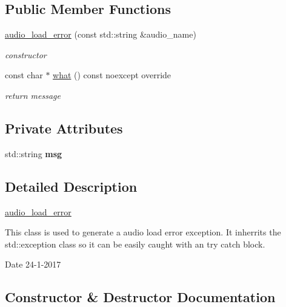 \subsection*{Public Member Functions}
\begin{DoxyCompactItemize}
\item 
\hyperlink{classaudio__load__error_a6eea512cfea7b3d438afc5c1af8c63aa}{audio\+\_\+load\+\_\+error} (const std\+::string \&audio\+\_\+name)
\begin{DoxyCompactList}\small\item\em constructor \end{DoxyCompactList}\item 
const char $\ast$ \hyperlink{classaudio__load__error_a364ad9c1cb7de37f0cb3e33dbebbaa47}{what} () const noexcept override
\begin{DoxyCompactList}\small\item\em return message \end{DoxyCompactList}\end{DoxyCompactItemize}
\subsection*{Private Attributes}
\begin{DoxyCompactItemize}
\item 
\mbox{\label{classaudio__load__error_a95628dfb2fb03d93f2864a7e87cf7e79}} 
std\+::string {\bfseries msg}
\end{DoxyCompactItemize}


\subsection{Detailed Description}
\hyperlink{classaudio__load__error}{audio\+\_\+load\+\_\+error} 

This class is used to generate a audio load error exception. It inherrits the std\+::exception class so it can be easily caught with an try catch block.

\begin{DoxyDate}{Date}
24-\/1-\/2017 
\end{DoxyDate}


\subsection{Constructor \& Destructor Documentation}
\mbox{\label{classaudio__load__error_a6eea512cfea7b3d438afc5c1af8c63aa}} 
